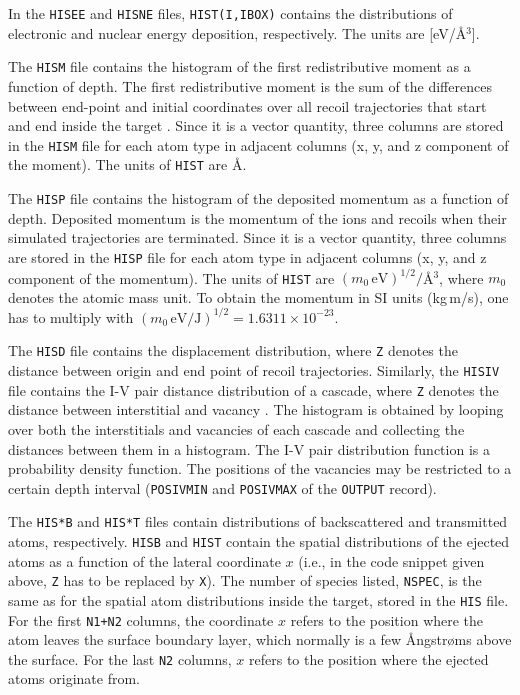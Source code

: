 In the \texttt{HISEE} and \texttt{HISNE} files, \texttt{HIST(I,IBOX)} 
contains the distributions of electronic and nuclear energy deposition,
respectively. The units are [eV/\AA$^3$]. 

The \texttt{HISM} file contains the histogram of the first redistributive moment
as a function of depth. The first redistributive moment is the sum of the
differences between end-point and initial coordinates over all recoil
trajectories that start and end inside the target \cite{hobler_crater_2018}.
Since it is a vector quantity, three columns are stored in the \texttt{HISM}
file for each atom type in adjacent columns (x, y, and z component of the
moment). The units of \texttt{HIST} are \AA. 

The \texttt{HISP} file contains the histogram of the deposited momentum as a
function of depth. Deposited momentum is the momentum of the ions and recoils
when their simulated trajectories are terminated. Since it is a vector quantity,
three columns are stored in the \texttt{HISP} file for each atom type in
adjacent columns (x, y, and z component of the momentum). The units of
\texttt{HIST} are $(m_0 \, \mathrm{eV})^{1/2}/$\AA$^3$, where $m_0$ denotes the
atomic mass unit. To obtain the momentum in SI units (kg$\,$m/s), one has to
multiply with $(m_0 \, \mathrm{eV/J})^{1/2} = 1.6311 \times 10^{-23}$.

The \texttt{HISD} file contains the displacement distribution, where \texttt{Z}
denotes the distance between origin and end point of recoil trajectories.
Similarly, the \texttt{HISIV} file contains the I-V pair distance distribution
of a cascade, where \texttt{Z} denotes the distance between interstitial and
vacancy \cite{hobler_continuum_1999}. The histogram is obtained by looping over
both the interstitials and vacancies of each cascade and collecting the
distances between them in a histogram. The I-V pair distribution function is a
probability density function. The positions of the vacancies may be restricted
to a certain depth interval (\texttt{POSIVMIN} and \texttt{POSIVMAX} of the
\texttt{OUTPUT} record).   

The \texttt{HIS*B} and \texttt{HIS*T} files contain distributions of
backscattered and transmitted atoms, respectively. \texttt{HISB} and
\texttt{HIST} contain the spatial distributions of the ejected atoms as a
function of the lateral coordinate $x$ (i.e., in the code snippet given above,
\texttt{Z} has to be replaced by \texttt{X}). The number of species listed,
\texttt{NSPEC}, is the same as for the spatial atom distributions inside the
target, stored in the \texttt{HIS} file. For the first \texttt{N1+N2} columns,
the coordinate $x$ refers to the position where the atom leaves the surface
boundary layer, which normally is a few {\AA}ngstr{\o}ms above the surface. For
the last \texttt{N2} columns, $x$ refers to the position where the ejected atoms
originate from.  

